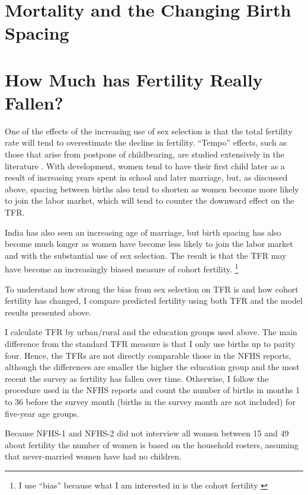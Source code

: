 \documentclass[12pt,letterpaper]{article}
\begin{document}
\section{Mortality and the Changing Birth Spacing\label{sec:mortality}}




\section{How Much has Fertility Really Fallen?\label{sec:fertility}}

One of the effects of the increasing use of sex selection is that the total fertility 
rate will tend to overestimate the decline in fertility.
``Tempo'' effects, such as those that arise from postpone of childbearing, are studied 
extensively in the literature \citep{Bongaarts1999}.
With development, women tend to have their first child later as a result of increasing 
years spent in school and later marriage, but, as discussed above, spacing between births 
also tend to shorten as women become more likely to join the labor market, which will 
tend to counter the downward effect on the TFR.

India has also seen an increasing age of marriage, but birth spacing has also become
much longer as women have become less likely to join the labor market and with the 
substantial use of sex selection.
The result is that the TFR may have become an increasingly biased measure of cohort fertility.%
\footnote{
I use ``bias'' because what I am interested in is the cohort fertility \citep{Ni-Bhrolchain2011}
}

To understand how strong the bias from sex selection on TFR is and how cohort fertility
has changed, I compare predicted fertility using both TFR and the model results
presented above.

I calculate TFR by urban/rural and the education groups used above.
The main difference from the standard TFR measure is that I only use births up to parity
four.
Hence, the TFRs are not directly comparable those in the NFHS reports, although the
differences are smaller the higher the education group and the most recent the survey
as fertility has fallen over time.
Otherwise, I follow the procedure used in the NFHS reports and count the number of births
in months 1 to 36 before the survey month (births in the survey month are not included)
for five-year age groups.

Because NFHS-1 and NFHS-2 did not interview all women between 15 and 49 about fertility
the number of women is based on the household rosters, assuming that never-married 
women have had no children.
\end{document}
